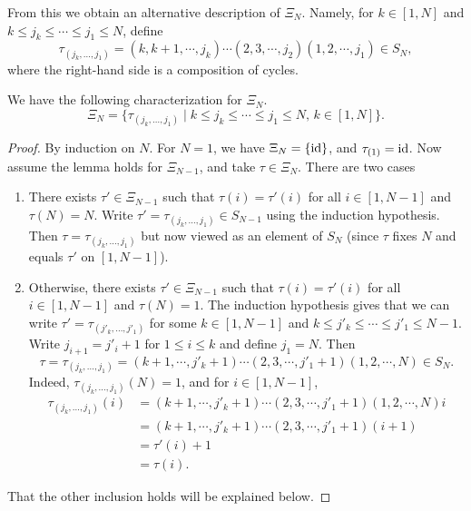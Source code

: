From this we obtain an alternative description of $\Xi_N$. Namely, for $k\in [1, N]$
and $k \leq j_k \leq \cdots \leq j_1 \leq N$, define
\begin{equation*}
	\tau_{(j_k, \dots, j_1)} = (k,k+1, \cdots, j_k)\cdots (2,3, \cdots, j_2)(1,2,\cdots, j_1)\in S_N,
\end{equation*}
%
where the right-hand side is a composition of cycles.
\begin{lemma}
	We have the following characterization for $\Xi_N$.
	\begin{equation*}
		\Xi_N = \{\tau_{(j_k, \dots, j_1)} \mid k \leq j_k \leq \cdots \leq j_1 \leq N,\, k\in [1, N]\}.
	\end{equation*}
\end{lemma}
\begin{proof}
	By induction on $N$. For $N = 1$, we have $\Xi_N = \{\operatorname{id}\}$, and $\tau_{(1)} = \operatorname{id}$. Now assume the lemma holds for $\Xi_{N-1}$, and take $\tau \in \Xi_N$. There are two cases
	\begin{enumerate}
		\item There exists $\tau' \in \Xi_{N-1}$ such that $\tau(i) = \tau'(i)$ for all $i\in [1,
				      N-1]$ and $\tau(N) = N$. Write $\tau' = \tau_{(j_k, \dots, j_1)} \in S_{N-1}$ using the
		      induction hypothesis. Then $\tau = \tau_{(j_k, \dots, j_1)}$ but now viewed as an
		      element of $S_N$ (since $\tau$ fixes $N$ and equals $\tau'$ on $[1, N-1]$).
		\item Otherwise, there exists $\tau' \in \Xi_{N-1}$ such that $\tau(i) = \tau'(i)$ for all
		      $i\in [1, N-1]$ and $\tau(N) = 1$. The induction hypothesis gives that we can write
		      $\tau' = \tau_{(j'_k, \dots, j'_1)}$ for some $k \in [1, N - 1]$ and $k \leq j'_k \leq
			      \cdots \leq j'_1 \leq N - 1$. Write $j_{i+1} = j'_i + 1$ for $1 \leq i \leq k$ and
		      define $j_1 = N$. Then
		      \begin{equation*}
			      \tau = \tau_{(j_k, \dots, j_1)} = (k+1, \cdots, j'_k + 1) \cdots (2, 3, \cdots ,j'_1 + 1)(1,2, \cdots, N) \in S_N.
		      \end{equation*}
		      Indeed, $\tau_{(j_k, \dots, j_1)}(N) = 1$, and for $i \in [1, N-1]$,
		      \begin{align*}
			      \tau_{(j_k, \dots, j_1)}(i)
			       & = (k+1, \cdots, j'_k + 1) \cdots (2, 3, \cdots, j'_1 + 1)(1,2, \cdots, N) i \\
			       & = (k+1, \cdots, j'_k + 1) \cdots (2, 3, \cdots, j'_1 + 1) (i+1)             \\
			       & = \tau'(i) + 1                                                              \\
			       & = \tau(i).
		      \end{align*}
	\end{enumerate}

	That the other inclusion holds will be explained below.
\end{proof}

